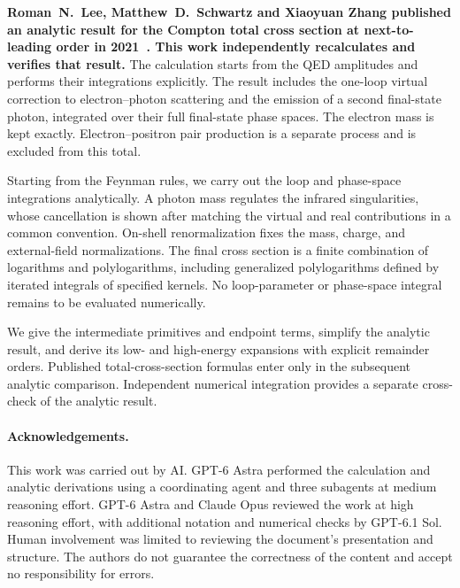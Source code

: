 \textbf{Roman~N.~Lee, Matthew~D.~Schwartz and Xiaoyuan Zhang published an analytic
result for the Compton total cross section at next-to-leading order
in 2021~\cite{qed-processes-lsz}. This work independently recalculates
and verifies that result.}
The calculation starts from the QED amplitudes and performs their
integrations explicitly. The result includes the one-loop virtual correction
to electron--photon scattering and the emission of a second final-state
photon, integrated over their full final-state phase spaces. The electron
mass is kept exactly. Electron--positron pair production is a separate
process and is excluded from this total.

Starting from the Feynman rules, we carry out the loop and phase-space
integrations analytically. A photon mass regulates the infrared
singularities, whose cancellation is shown after matching the virtual
and real contributions in a common convention. On-shell renormalization
fixes the mass, charge, and external-field normalizations. The final
cross section is a finite combination of logarithms and polylogarithms,
including generalized polylogarithms defined by iterated integrals of
specified kernels. No loop-parameter or phase-space integral remains
to be evaluated numerically.

We give the intermediate primitives and endpoint terms, simplify the
analytic result, and derive its low- and high-energy expansions with
explicit remainder orders. Published total-cross-section formulas enter
only in the subsequent analytic comparison. Independent numerical
integration provides a separate cross-check of the analytic result.

\paragraph{Acknowledgements.} This work was carried out by AI. GPT-6 Astra performed the
calculation and analytic derivations using a coordinating agent and three
subagents at medium reasoning effort. GPT-6 Astra and Claude Opus reviewed
the work at high reasoning effort, with additional notation and numerical
checks by GPT-6.1 Sol.
Human involvement was limited to reviewing the document's presentation
and structure. The authors do not guarantee the
correctness of the content and accept no responsibility for errors.
